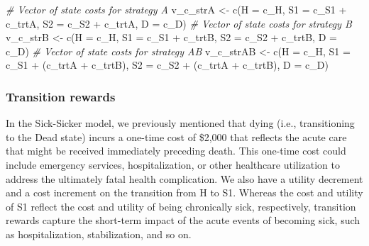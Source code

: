 \documentclass[
]{article}
\newenvironment{Shaded}{\begin{snugshade}}{\end{snugshade}}
\newcommand{\AttributeTok}[1]{\textcolor[rgb]{0.77,0.63,0.00}{#1}}
\newcommand{\CommentTok}[1]{\textcolor[rgb]{0.56,0.35,0.01}{\textit{#1}}}
\newcommand{\FunctionTok}[1]{\textcolor[rgb]{0.00,0.00,0.00}{#1}}
\newcommand{\NormalTok}[1]{#1}
\newcommand{\OtherTok}[1]{\textcolor[rgb]{0.56,0.35,0.01}{#1}}
\newcommand{\SpecialCharTok}[1]{\textcolor[rgb]{0.00,0.00,0.00}{#1}}
\begin{document}
\begin{Shaded}
\begin{Highlighting}[]
\CommentTok{\# Vector of state costs for strategy A}
\NormalTok{v\_c\_strA }\OtherTok{\textless{}{-}} \FunctionTok{c}\NormalTok{(}\AttributeTok{H  =}\NormalTok{ c\_H, }
              \AttributeTok{S1 =}\NormalTok{ c\_S1 }\SpecialCharTok{+}\NormalTok{ c\_trtA, }
              \AttributeTok{S2 =}\NormalTok{ c\_S2 }\SpecialCharTok{+}\NormalTok{ c\_trtA, }
              \AttributeTok{D  =}\NormalTok{ c\_D)}
\CommentTok{\# Vector of state costs for strategy B}
\NormalTok{v\_c\_strB }\OtherTok{\textless{}{-}} \FunctionTok{c}\NormalTok{(}\AttributeTok{H  =}\NormalTok{ c\_H, }
              \AttributeTok{S1 =}\NormalTok{ c\_S1 }\SpecialCharTok{+}\NormalTok{ c\_trtB, }
              \AttributeTok{S2 =}\NormalTok{ c\_S2 }\SpecialCharTok{+}\NormalTok{ c\_trtB, }
              \AttributeTok{D  =}\NormalTok{ c\_D)}
\CommentTok{\# Vector of state costs for strategy AB}
\NormalTok{v\_c\_strAB }\OtherTok{\textless{}{-}} \FunctionTok{c}\NormalTok{(}\AttributeTok{H  =}\NormalTok{ c\_H, }
               \AttributeTok{S1 =}\NormalTok{ c\_S1 }\SpecialCharTok{+}\NormalTok{ (c\_trtA }\SpecialCharTok{+}\NormalTok{ c\_trtB), }
               \AttributeTok{S2 =}\NormalTok{ c\_S2 }\SpecialCharTok{+}\NormalTok{ (c\_trtA }\SpecialCharTok{+}\NormalTok{ c\_trtB), }
               \AttributeTok{D  =}\NormalTok{ c\_D)}
\end{Highlighting}
\end{Shaded}

\hypertarget{transition-rewards}{%
\subsubsection{Transition rewards}\label{transition-rewards}}

In the Sick-Sicker model, we previously mentioned that dying (i.e., transitioning to the Dead state) incurs a one-time cost of \$2,000 that reflects the acute care that might be received immediately preceding death. This one-time cost could include emergency services, hospitalization, or other healthcare utilization to address the ultimately fatal health complication. We also have a utility decrement and a cost increment on the transition from H to S1. Whereas the cost and utility of S1 reflect the cost and utility of being chronically sick, respectively, transition rewards capture the short-term impact of the acute events of becoming sick, such as hospitalization, stabilization, and so on.
\end{document}
